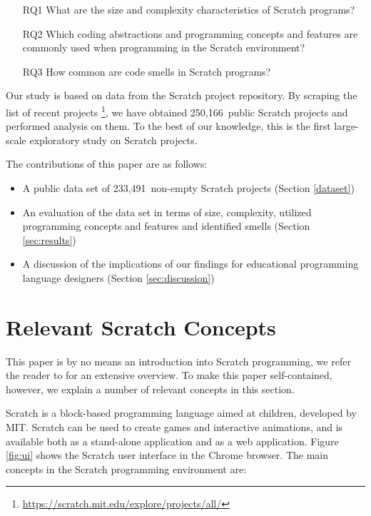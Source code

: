 \documentclass{sig-alternate}
\newcommand{\nPrograms}{250,166}
\newcommand{\nScriptPrograms}{233,491}
\begin{document}
\begin{itemize}
\item[RQ1] What are the size and complexity characteristics of Scratch programs?
\item[RQ2] Which coding abstractions and programming concepts and features are commonly used when programming in the Scratch environment?
\item[RQ3] How common are code smells in Scratch programs?
\end{itemize}

Our study is based on data from the Scratch project repository. By scraping the list of recent projects \footnote{\label{scratchpublic}\url{https://scratch.mit.edu/explore/projects/all/}}, we have obtained \nPrograms~public Scratch projects and performed analysis on them. To the best of our knowledge, this is the first large-scale exploratory study on Scratch projects.

The contributions of this paper are as follows:

\begin{itemize}
	\item{A public data set of \nScriptPrograms~non-empty Scratch projects (Section \ref{dataset})}
	\item{An evaluation of the data set in terms of size, complexity, utilized programming concepts and features and identified smells (Section \ref{sec:results})}
	\item{A discussion of the implications of our findings for educational programming language designers (Section \ref{sec:discussion})}
\end{itemize}

\section{Relevant Scratch Concepts}
\label{sec:scratch}
This paper is by no means an introduction into Scratch programming, we refer the reader to \cite{brennan_creative_2014} for an extensive overview. To make this paper self-contained, however, we explain a number of relevant concepts in this section. 

Scratch is a block-based programming language aimed at children, developed by MIT. Scratch can be used to create games and interactive animations, and is available both as a stand-alone application and as a web application. Figure \ref{fig:ui} shows the Scratch user interface in the Chrome browser. The main concepts in the Scratch programming environment are:
\end{document}
